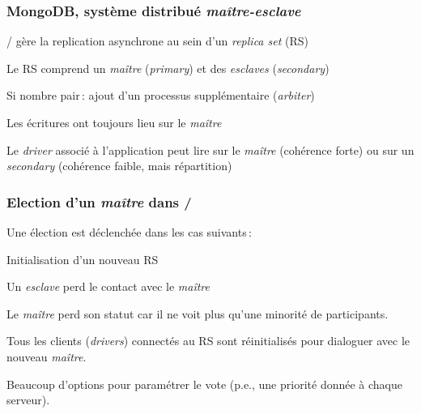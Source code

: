 
\begin{frame}
\frametitle{MongoDB, système distribué \textit{maître-esclave}}



\begin{redbullet}
  \item \mongodb/ gère la \alert{replication asynchrone} au sein d'un \textit{replica set} (RS)
  
  \item Le RS comprend un \textit{maître} (\textit{primary}) et des \textit{esclaves} (\textit{secondary})
  
   \item Si nombre pair\,: ajout d'un processus supplémentaire (\textit{arbiter})
   
   \item Les écritures ont \alert{toujours} lieu sur le \textit{maître}
   
   \item Le \textit{driver} associé à l'application peut lire sur le \textit{maître} (cohérence forte)
       ou sur un \textit{secondary} (cohérence faible, mais répartition)
  
\end{redbullet}

\end{frame}


\begin{frame}
\frametitle{Election d'un \textit{maître} dans \mongodb/}

Une élection est déclenchée dans les cas suivants\,:

\begin{redbullet}
  \item Initialisation d'un nouveau RS
  \item Un \textit{esclave} perd le contact avec le \textit{maître}
  \item Le \textit{maître} perd son statut car il ne voit plus qu'une minorité de participants.
\end{redbullet}
\vfill

\begin{redbullet}
  \item Tous les clients (\textit{drivers}) connectés au RS sont réinitialisés pour dialoguer avec le nouveau \textit{maître}.
  \item Beaucoup d'options pour paramétrer le vote (p.e., une \alert{priorité} donnée à chaque serveur). 
 \end{redbullet}

\end{frame}


